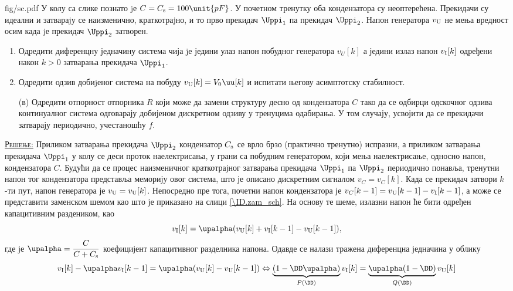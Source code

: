 \mnDifficult
\begin{slikaDesno}{fig/sc.pdf}
    \PID
    У колу са слике познато jе $C = C_{\rm s} = 100\unit{pF}$. 
    У почетном тренутку оба кондензатора су неоптерећена.
Прекидачи су идеални и затвараjу се наизменично,
краткотраjно, и то прво прекидач $\Uppi_1$ па прекидач
$\Uppi_2$. Напон генератора $v_{\rm U}$ не мења вредност осим када
jе прекидач $\Uppi_2$ затворен.
\end{slikaDesno}
\begin{enumerate}[label=(\alph*)]
    \item Одредити диференцну једначину система чија jе
    једини улаз напон побудног генератора $v_U[k]$ а једини излаз напон 
    $v_{\rm I}[k]$ одређени након $k > 0$ затварања прекидача $\Uppi_1$.
    \item Одредити одзив добиjеног система на побуду $v_{\rm U}[k] = V_0 \uu[k]$ и 
    испитати његову асимптотску стабилност.
    \item[(в\textcolor{red}{\noway})] 
    Одредити отпорност отпорника $R$ који може да замени 
    структуру десно од кондензатора $C$ тако да се одбирци одскочног 
    одзива континуалног система одговарају добијеном дискретном одзиву у тренуцима 
    одабирања. У том случају, усвојити да се прекидачи затварају периодично, 
    учестаношћу $f$.
\end{enumerate}
\vspace*{2mm}

\textsc{\underline{Решење:}} Приликом затварања прекидача $\Uppi_2$ кондензатор $C_{\rm s}$ се врло брзо (практично тренутно) испразни, а 
приликом затварања прекидача $\Uppi_1$ у колу се деси проток наелектрисања, у грани са побудним генератором, који мења наелектрисање, односно напон, 
кондензатора $C$. Будући да се процес
наизменичног краткотрајног затварања прекидача $\Uppi_1$ па $\Uppi_2$ периодично понавља, тренутни напон тог кондензатора представља 
меморију овог система, што је описано дискретним сигналом $v_C = {v_C}[k]$. Када се прекидач затвори $k$-ти пут, напон генератора је 
$v_{\rm U} = v_{\rm U}[k]$. Непосредно пре тога, почетни напон кондензатора је $v_{C}[k-1] = v_{\rm U}[k-1] - v_{\rm I}[k-1]$, а
може се представити заменском шемом као што је приказано на слици \ref{\ID.zam_sch}. На основу те шеме, излазни напон ће бити 
одређен капацитивним раздеником, као
\begin{equation}
    v_{\rm I}[k] = \upalpha (v_{\rm U}[k] + v_{\rm I}[k-1] - v_{\rm U}[k-1] ),
\end{equation}
где је $\upalpha =  \dfrac{C}{C + C_{\rm s}}$ коефицијент капацитивног разделника напона.
Одавде се налази тражена диференцна једначина у облику 
\begin{equation}
    v_{\rm I}[k] - \upalpha v_{\rm I}[k-1] = \upalpha( v_{\rm U}[k] - v_{\rm U}[k-1] ) 
    \Leftrightarrow
    \underbrace{( 1 - \DD \upalpha )}_{P(\DD)} v_{\rm I}[k] = \underbrace{\upalpha(1 - \DD)}_{Q(\DD)} v_{\rm U}[k]
\end{equation}

